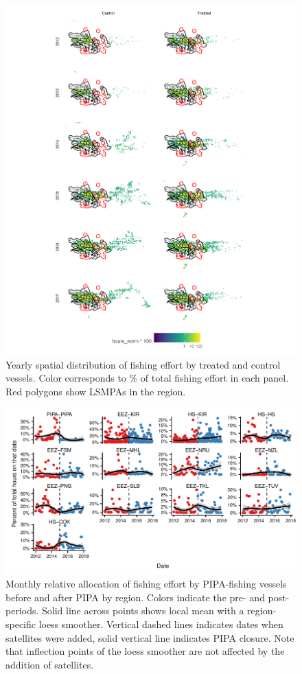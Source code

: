 \documentclass[9pt,twoside,lineno]{pnas-new}
\begin{document}
\begin{figure}
\centering
\includegraphics{img/fishing_raster.png}
\caption{\label{fig:fishing_raster}Yearly
spatial distribution of fishing effort by treated and control vessels.
Color corresponds to \% of total fishing effort in each panel.
Red polygons show LSMPAs in the region.}
\end{figure}

\begin{figure}
\centering
\includegraphics{img/redist_trend.pdf}
\caption{\label{fig:redist_trend}Monthly
relative allocation of fishing effort by PIPA-fishing vessels before and
after PIPA by region. Colors indicate the pre- and post- periods. Solid line
across points shows local mean with a region-specific loess smoother.
Vertical dashed lines indicates dates when satellites were added, solid vertical
line indicates PIPA closure. Note that inflection points of
the loess smoother are not affected by the addition of satellites.}
\end{figure}
\end{document}
